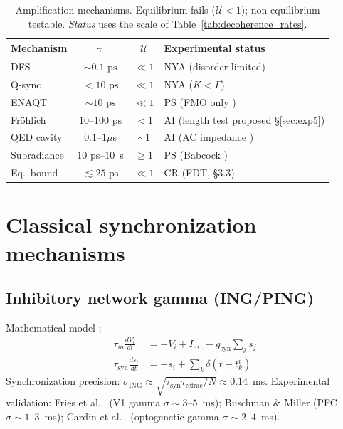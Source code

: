 \documentclass[twocolumn,10pt]{article}
\newcommand{\ps}{\text{~ps}}
\begin{document}
\begin{table}[h]
\centering
\caption{Amplification mechanisms. Equilibrium fails ($\mathcal{U} < 1$);
non-equilibrium testable. \emph{Status} uses the scale of
Table~\ref{tab:decoherence_rates}.}
\label{tab:mechanisms}
\footnotesize
\begin{tabular}{p{1.9cm}cc p{2.8cm}}
\toprule
\textbf{Mechanism} & $\boldsymbol{\tau}$ & $\boldsymbol{\mathcal{U}}$
& \textbf{Experimental status} \\
\midrule
DFS & $\sim 0.1\ps$ & $\ll 1$ & NYA (disorder-limited) \\
Q-sync & $<10\ps$ & $\ll 1$ & NYA ($K<\Gamma$) \\
ENAQT & $\sim 10\ps$ & $\ll 1$ & PS (FMO only \cite{Chin2013}) \\
\midrule
Fr\"ohlich & $10\text{--}100\ps$ & $<1$
& AI (length test proposed \S\ref{sec:exp5}) \\
QED cavity & $0.1\text{--}1\mu$s & $\sim 1$
& AI (AC impedance \cite{Santelices2017}) \\
Subradiance & $10\ps\text{--}10$~s & $\ge 1$
& PS (Babcock \cite{Babcock2024}) \\
\midrule
Eq.\ bound & $\lesssim 25\ps$ & $\ll 1$ & CR (FDT, \S 3.3) \\
\bottomrule
\end{tabular}
\end{table}


\section{Classical synchronization mechanisms}

\subsection{Inhibitory network gamma (ING/PING)}

Mathematical model \cite{Borgers2003,Brunel2003,Buzsaki2012}:
\begin{align}
\tau_m \frac{dV_i}{dt} &= -V_i + I_{\text{ext}} - g_{\text{syn}}
\sum_j s_j \\
\tau_{\text{syn}} \frac{ds_i}{dt} &= -s_i + \sum_k \delta(t - t_k^i)
\end{align}
Synchronization precision: $\sigma_{\text{ING}} \approx \sqrt{\tau_{\text{syn}}
\tau_{\text{refrac}}/N} \approx 0.14$~ms. Experimental validation: Fries
et al.\ \cite{Fries2001} (V1 gamma $\sigma \sim 3\text{--}5$~ms); Buschman
\& Miller \cite{Buschman2007} (PFC $\sigma \sim 1\text{--}3$~ms); Cardin
et al.\ \cite{Cardin2009} (optogenetic gamma $\sigma \sim 2\text{--}4$~ms).
\end{document}
